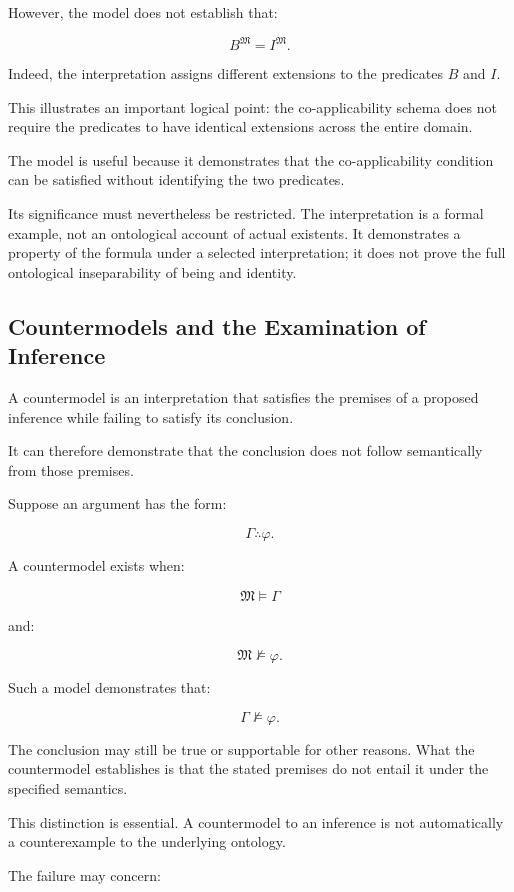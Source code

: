 However, the model does not establish that:

\[
    B^{\mathfrak{M}} = I^{\mathfrak{M}}.
\]

Indeed, the interpretation assigns different extensions
to the predicates \(B\) and \(I\).

This illustrates an important logical point: the
co-applicability schema does not require the predicates
to have identical extensions across the entire domain.

The model is useful because it demonstrates that the
co-applicability condition can be satisfied without
identifying the two predicates.

Its significance must nevertheless be restricted.
The interpretation is a formal example, not an
ontological account of actual existents. It demonstrates
a property of the formula under a selected interpretation;
it does not prove the full ontological inseparability
of being and identity.

\subsection{Countermodels and the Examination of Inference}

A countermodel is an interpretation that satisfies
the premises of a proposed inference while failing
to satisfy its conclusion.

It can therefore demonstrate that the conclusion
does not follow semantically from those premises.

Suppose an argument has the form:

\[
    \Gamma \therefore \varphi.
\]

A countermodel exists when:

\[
    \mathfrak{M} \models \Gamma
\]

and:

\[
    \mathfrak{M} \not\models \varphi.
\]

Such a model demonstrates that:

\[
    \Gamma \not\models \varphi.
\]

The conclusion may still be true or supportable for
other reasons. What the countermodel establishes is
that the stated premises do not entail it under the
specified semantics.

This distinction is essential. A countermodel to
an inference is not automatically a counterexample
to the underlying ontology.

The failure may concern:

